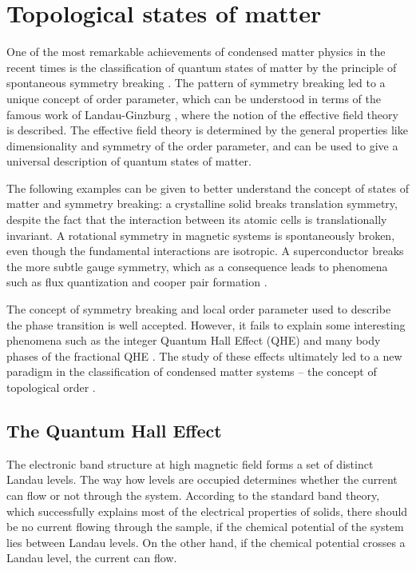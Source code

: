 \documentclass[titlepage,a4paper]{book}
\newcommand{\wciecie}{\quad\phantom{v}}
\begin{document}
\section{Topological states of matter}
\wciecie
One of the most remarkable achievements of condensed matter physics in the recent times is the classification of quantum states of matter by the principle of spontaneous symmetry breaking \cite{Anderson_Topology}. The pattern of symmetry breaking led to a unique concept of order parameter, which can be understood in terms of the famous work of Landau-Ginzburg \cite{Landau_Topology}, where the notion of the effective field theory is described. The effective field theory is determined by the general properties like dimensionality and symmetry of the order parameter, and can be used to give a universal description of quantum states of matter.

The following examples can be given to better understand the concept of states of matter and symmetry breaking: a crystalline solid breaks translation symmetry, despite the fact that the interaction between its atomic cells is translationally invariant. A rotational symmetry in magnetic systems is spontaneously broken, even though the fundamental interactions are isotropic. A superconductor breaks the more subtle gauge symmetry, which as a consequence leads to phenomena such as flux quantization and cooper pair formation \cite{Josephson_Topology}.

The concept of symmetry breaking and local order parameter used to describe the phase transition is well accepted. However, it fails to explain some interesting phenomena such as the integer Quantum Hall Effect (QHE) \cite{Klitzing_Topology} and many body phases of the fractional QHE \cite{Tsui_Topology}. The study of these effects ultimately led to a new paradigm in the classification of condensed matter systems -- the concept of topological order \cite{Laughlin_Topology} \cite{Thouless_Topology}.

\subsection{The Quantum Hall Effect}
\wciecie
The electronic band structure at high magnetic field forms a set of distinct Landau levels. The way how levels are occupied determines whether the current can flow or not through the system. According to the standard band theory, which successfully explains most of the electrical properties of solids, there should be no current flowing through the sample, if the chemical potential of the system lies between Landau levels. On the other hand, if the chemical potential crosses a Landau level, the current can flow. 
\end{document}
